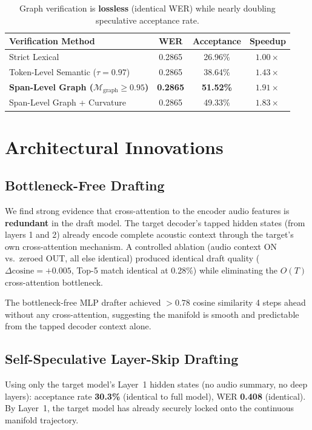 \documentclass[11pt,a4paper]{article}
\begin{document}
\begin{table}[H]
\centering
\small
\begin{tabular}{@{}lccc@{}}
\toprule
\textbf{Verification Method} & \textbf{WER} & \textbf{Acceptance} & \textbf{Speedup} \\
\midrule
Strict Lexical & 0.2865 & 26.96\% & $1.00\times$ \\
Token-Level Semantic ($\tau\!=\!0.97$) & 0.2865 & 38.64\% & $1.43\times$ \\
\textbf{Span-Level Graph ($\mathcal{M}_{\mathrm{graph}} \geq 0.95$)} & \textbf{0.2865} & \textbf{51.52\%} & $\mathbf{1.91\times}$ \\
Span-Level Graph + Curvature & 0.2865 & 49.33\% & $1.83\times$ \\
\bottomrule
\end{tabular}
\caption{Graph verification is \textbf{lossless} (identical WER) while nearly doubling speculative acceptance rate.}
\label{tab:graph}
\end{table}


\section{Architectural Innovations}

\subsection{Bottleneck-Free Drafting}
We find strong evidence that cross-attention to the encoder audio features is \textbf{redundant} in the draft model.
The target decoder's tapped hidden states (from layers 1 and 2) already encode complete acoustic context through the target's own cross-attention mechanism.
A controlled ablation (audio context ON vs.\ zeroed OUT, all else identical) produced identical draft quality ($\Delta\text{cosine} = +0.005$, Top-5 match identical at 0.28\%) while eliminating the $O(T)$ cross-attention bottleneck.

The bottleneck-free MLP drafter achieved $>0.78$ cosine similarity 4 steps ahead without any cross-attention, suggesting the manifold is smooth and predictable from the tapped decoder context alone.

\subsection{Self-Speculative Layer-Skip Drafting}
Using only the target model's Layer~1 hidden states (no audio summary, no deep layers):
acceptance rate \textbf{30.3\%} (identical to full model), WER \textbf{0.408} (identical).
By Layer~1, the target model has already securely locked onto the continuous manifold trajectory.
\end{document}
